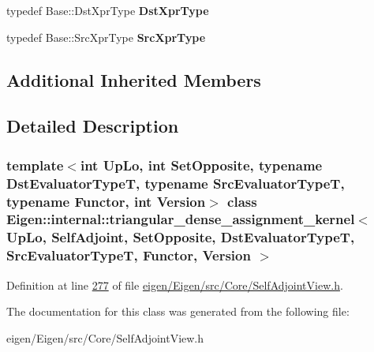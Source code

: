 \begin{DoxyCompactItemize}
typedef Base\+::\+Dst\+Xpr\+Type {\bfseries Dst\+Xpr\+Type}
\item 
\mbox{\label{class_eigen_1_1internal_1_1triangular__dense__assignment__kernel_3_01_up_lo_00_01_self_adjoint_0bf432100a6648c0f02715a71126a9f44_a044acf1ad867ff426cdd33b66e74d7dc}} 
typedef Base\+::\+Src\+Xpr\+Type {\bfseries Src\+Xpr\+Type}
\end{DoxyCompactItemize}
\subsection*{Additional Inherited Members}


\subsection{Detailed Description}
\subsubsection*{template$<$int Up\+Lo, int Set\+Opposite, typename Dst\+Evaluator\+TypeT, typename Src\+Evaluator\+TypeT, typename Functor, int Version$>$\newline
class Eigen\+::internal\+::triangular\+\_\+dense\+\_\+assignment\+\_\+kernel$<$ Up\+Lo, Self\+Adjoint, Set\+Opposite, Dst\+Evaluator\+Type\+T, Src\+Evaluator\+Type\+T, Functor, Version $>$}



Definition at line \hyperlink{eigen_2_eigen_2src_2_core_2_self_adjoint_view_8h_source_l00277}{277} of file \hyperlink{eigen_2_eigen_2src_2_core_2_self_adjoint_view_8h_source}{eigen/\+Eigen/src/\+Core/\+Self\+Adjoint\+View.\+h}.



The documentation for this class was generated from the following file\+:\begin{DoxyCompactItemize}
\item 
eigen/\+Eigen/src/\+Core/\+Self\+Adjoint\+View.\+h\end{DoxyCompactItemize}
